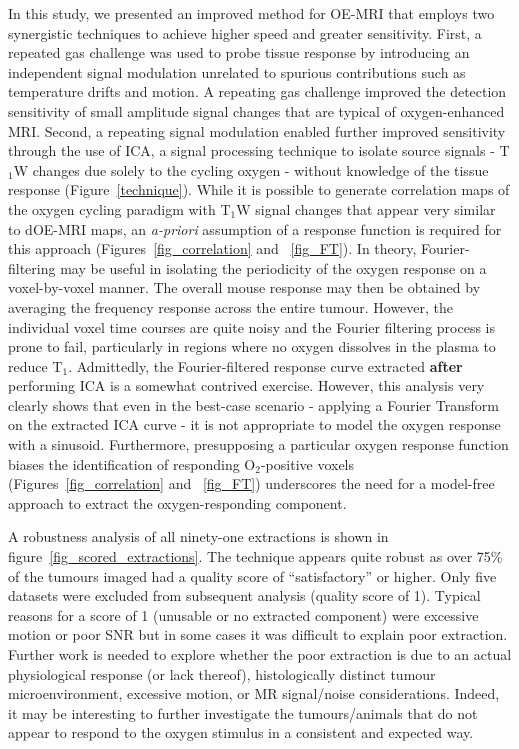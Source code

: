 In this study, we presented an improved method for \acs{OE-MRI} that employs two synergistic techniques to achieve higher speed and greater sensitivity.
First, a repeated gas challenge was used to probe tissue response by introducing an independent signal modulation unrelated to spurious contributions such as temperature drifts and motion.
A repeating gas challenge improved the detection sensitivity of small amplitude signal changes that are typical of oxygen-enhanced MRI.
Second, a repeating signal modulation enabled further improved sensitivity through the use of \acs{ICA}, a signal processing technique to isolate source signals - T$_1$W changes due solely to the cycling oxygen - without knowledge of the tissue response (Figure~\ref{technique}).
While it is possible to generate correlation maps of the oxygen cycling paradigm with T$_1$W signal changes that appear very similar to \acs{dOE-MRI} maps, an \emph{a-priori} assumption of a response function is required for this approach (Figures~\ref{fig_correlation} and ~\ref{fig_FT}).
In theory, Fourier-filtering may be useful in isolating the periodicity of the oxygen response on a voxel-by-voxel manner.
The overall mouse response may then be obtained by averaging the frequency response across the entire tumour.
However, the individual voxel time courses are quite noisy and the Fourier filtering process is prone to fail, particularly in regions where no oxygen dissolves in the plasma to reduce T$_1$.
Admittedly, the Fourier-filtered response curve extracted \textbf{after} performing \acs{ICA} is a somewhat contrived exercise.
However, this analysis very clearly shows that even in the best-case scenario - applying a Fourier Transform on the extracted ICA curve - it is not appropriate to model the oxygen response with a sinusoid.
Furthermore, presupposing a particular oxygen response function biases the identification of responding O$_2$-positive voxels (Figures~\ref{fig_correlation} and ~\ref{fig_FT}) underscores the need for a model-free approach to extract the oxygen-responding component.

A robustness analysis of all ninety-one extractions is shown in figure~\ref{fig_scored_extractions}.
The technique appears quite robust as over 75\% of the tumours imaged had a quality score of ``satisfactory'' or higher.
Only five datasets were excluded from subsequent analysis (quality score of 1).
Typical reasons for a score of 1 (unusable or no extracted component) were excessive motion or poor SNR but in some cases it was difficult to explain poor extraction.
Further work is needed to explore whether the poor extraction is due to an actual physiological response (or lack thereof), histologically distinct tumour microenvironment, excessive motion, or MR signal/noise considerations.
Indeed, it may be interesting to further investigate the tumours/animals that do not appear to respond to the oxygen stimulus in a consistent and expected way.


